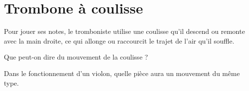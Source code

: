 \section{Trombone à coulisse}

Pour jouer ses notes, le tromboniste utilise une coulisse qu'il descend ou remonte avec la main droite, ce qui allonge ou raccourcit le trajet de l'air qu'il souffle.

\begin{questions}
	\question Que peut-on dire du mouvement de la coulisse ?
	
	\fillwithdottedlines{3cm}
	
	\question Dans le fonctionnement d'un violon, quelle pièce aura un mouvement du même type.
	\fillwithdottedlines{3cm}
\end{questions}